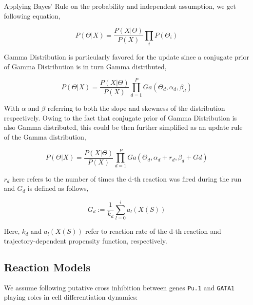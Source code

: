 \documentclass{bioinfo}
\begin{document}
Applying Bayes' Rule on the probability and independent assumption, we get following equation,

\begin{equation}
P(\Theta | X) = \frac{P(X | \Theta)}{P (X)} \prod_{i} P(\Theta_i)\label{eq:18}
\end{equation}

Gamma Distribution is particularly favored for the update since a conjugate prior of Gamma Distribution is in turn Gamma distributed,

\begin{equation}
P(\Theta | X) = \frac{P(X | \Theta)}{P (X)} \prod_{d=1}^{P} Ga(\Theta_d, \alpha_d, \beta_d)\label{eq:19}
\end{equation}

With $\alpha$ and $\beta$ referring to both the slope and skewness of the distribution respectively. Owing to the fact that conjugate prior of Gamma Distribution is also Gamma distributed, this could be then further simplified as an update rule of the Gamma distribution,

\begin{equation}
P(\Theta | X) = \frac{P(X | \Theta)}{P (X)} \prod_{d=1}^{P} Ga(\Theta_d, \alpha_d + r_d, \beta_d + Gd)\label{eq:20}
\end{equation}

$r_d$ here refers to the number of times the d-th reaction was fired during the run and $G_d$ is defined as follows,

\begin{equation}
G_d := \frac{1}{k_d} \sum_{l=0}^{i} a_{l}(X(S))\label{eq:21}
\end{equation}

Here, $k_d$ and $a_{l}(X(S))$ refer to reaction rate of the d-th reaction and trajectory-dependent propensity function, respectively.

\subsection{Reaction Models}

We assume following putative cross inhibition between genes \texttt{Pu.1} and \texttt{GATA1} playing roles in cell differentiation dynamics:
\end{document}
